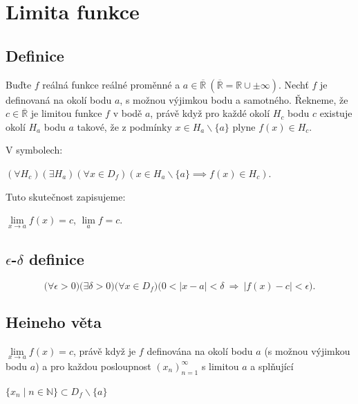 \documentclass{szzclass}
\author{Daniel Hampl}
\begin{document}

\tableofcontents
\newpage

\section{Limita funkce}
\subsection{Definice}
Buďte $f$ reálná funkce reálné proměnné a
$a \in \overline{\mathbb{R}}\ (\overline{\mathbb{R}}=\mathbb{R}\cup{\pm\infty})$. Nechť $f$ je definovaná na okolí bodu
$a$, s možnou výjimkou bodu a samotného. Řekneme, že
$c \in \overline{\mathbb{R}}$ je limitou funkce $f$ v bodě $a$,
právě když pro každé okolí $H_c$ bodu $c$ existuje okolí
$H_a$ bodu $a$ takové, že z podmínky $x \in H_a \backslash \{a\}$
plyne $f(x) \in H_c$.

V symbolech:
\begin{center}
$(\forall H_c)(\exists H_a)(\forall x \in D_f)(x \in H_a \backslash \{a\} \implies f(x) \in H_c)$.
\end{center}


Tuto skutečnost zapisujeme:
\begin{center}
$\lim\limits_{x \rightarrow a} f(x) = c$, $\lim\limits_a f = c$.
\end{center}

\subsection{$\epsilon$-$\delta$ definice}

\begin{equation*}
\big(\forall\epsilon>0\big)\big(\exists\delta>0\big)\big( \forall x \in D_f)( 0 < |x - a| < \delta \ \Rightarrow \ |f(x) - c| < \epsilon\big).\end{equation*}

\subsection{Heineho věta}
$\lim\limits_{x \rightarrow a} f(x) = c$, právě když je $f$ definována
na okolí bodu $a$ (s možnou výjimkou bodu $a$) a pro každou posloupnost
$(x_n)_{n=1}^\infty$ s limitou $a$ a splňující

\begin{center}
    $\{x_n \mid n\in\mathbb{N}\} \subset D_f \backslash \{a\}$
\end{center}
\end{document}
